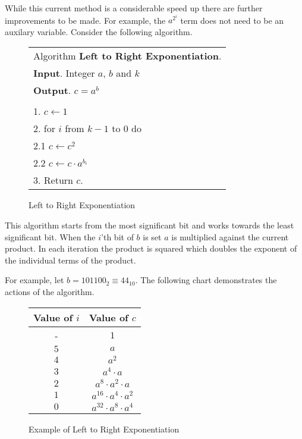 \documentclass[b5paper]{book}
\begin{document}
While this current method is a considerable speed up there are further improvements to be made.  For example, the $a^{2^i}$ term does not need to 
be an auxilary variable.  Consider the following algorithm.

\begin{figure}[!here]
\begin{small}
\begin{center}
\begin{tabular}{l}
\hline Algorithm \textbf{Left to Right Exponentiation}. \\
\textbf{Input}.   Integer $a$, $b$ and $k$ \\
\textbf{Output}.  $c = a^b$ \\
\hline \\
1.  $c \leftarrow 1$ \\
2.  for $i$ from $k - 1$ to $0$ do \\
\hspace{3mm}2.1  $c \leftarrow c^2$ \\
\hspace{3mm}2.2  $c \leftarrow c \cdot a^{b_i}$ \\
3.  Return $c$. \\
\hline
\end{tabular}
\end{center}
\end{small}
\caption{Left to Right Exponentiation}
\end{figure}

This algorithm starts from the most significant bit and works towards the least significant bit.  When the $i$'th bit of $b$ is set $a$ is
multiplied against the current product.  In each iteration the product is squared which doubles the exponent of the individual terms of the
product.  

For example, let $b = 101100_2 \equiv 44_{10}$.  The following chart demonstrates the actions of the algorithm.

\newpage\begin{figure}
\begin{center}
\begin{tabular}{|c|c|}
\hline \textbf{Value of $i$} & \textbf{Value of $c$} \\
\hline - & $1$ \\
\hline $5$ & $a$ \\
\hline $4$ & $a^2$ \\
\hline $3$ & $a^4 \cdot a$ \\
\hline $2$ & $a^8 \cdot a^2 \cdot a$ \\
\hline $1$ & $a^{16} \cdot a^4 \cdot a^2$ \\
\hline $0$ & $a^{32} \cdot a^8 \cdot a^4$ \\
\hline
\end{tabular}
\end{center}
\caption{Example of Left to Right Exponentiation}
\end{figure}
\end{document}
